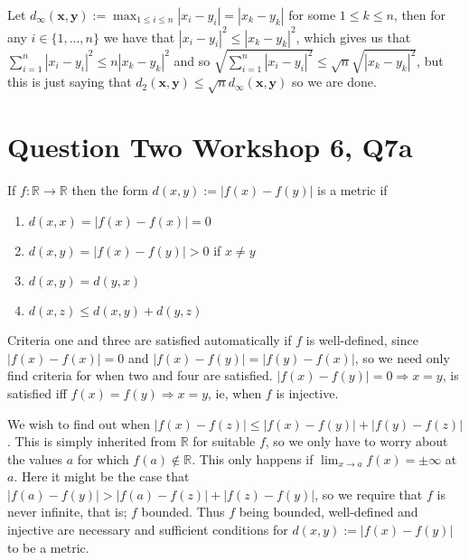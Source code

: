 \documentclass{article}
\def \R {\mathbb{R}}
\def \x {\textbf{x}}
\def \y {\textbf{y}}
\begin{document}
Let $d_\infty(\x,\y) := \max_{1\leq i\leq n}|x_i-y_i| = |x_k-y_k|$ for some $1\leq k\leq n$, then for any $i\in\{1,\dots,n\}$ we have that $|x_i-y_i|^2\leq|x_k-y_k|^2$, which gives us that $\sum_{i=1}^n|x_i-y_i|^2\leq n|x_k-y_k|^2$ and so $\sqrt{\sum_{i=1}^n|x_i-y_i|^2} \leq \sqrt{n}\sqrt{|x_k-y_k|^2}$, but this is just saying that $d_2(\x,\y) \leq \sqrt{n}d_\infty(\x,\y)$ so we are done.



\section*{Question Two Workshop 6, Q7a}

If $f:\R\to\R$ then the form $d(x,y) := |f(x)-f(y)|$ is a metric if
\begin{enumerate}
	\item $d(x,x) = |f(x)-f(x)| = 0$
	\item $d(x,y) = |f(x)-f(y)| > 0$ if $x\neq y$
	\item $d(x,y) = d(y,x)$
	\item $d(x,z) \leq d(x,y) + d(y,z)$
\end{enumerate}

Criteria one and three are satisfied automatically if $f$ is well-defined, since $|f(x)-f(x)|=0$ and $|f(x)-f(y)|=|f(y)-f(x)|$, so we need only find criteria for when two and four are satisfied. $|f(x)-f(y)|=0\Rightarrow x=y$, is satisfied iff $f(x)=f(y) \Rightarrow x=y$, ie, when $f$ is injective.

We wish to find out when $|f(x) - f(z)| \leq |f(x) - f(y)| + |f(y)-f(z)|$. This is simply inherited from $\R$ for suitable $f$, so we only have to worry about the values $a$ for which $f(a)\notin\R$. This only happens if  $\lim_{x\to a} f(x) =\pm\infty$ at $a$. Here it might be the case that $|f(a)-f(y)|>|f(a)-f(z)|+|f(z)-f(y)|$, so we require that $f$ is never infinite, that is; $f$ bounded. Thus $f$ being bounded, well-defined and injective are necessary and sufficient conditions for $d(x,y):=|f(x)-f(y)|$ to be a metric.
\end{document}
